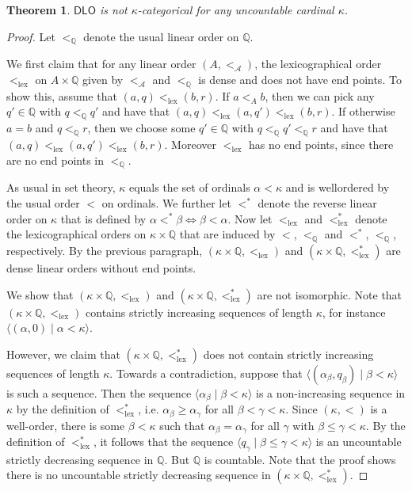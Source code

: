 \documentclass[a4paper, 11pt]{amsart}
\newtheorem{theorem}{Theorem}[subsection]
\theoremstyle{remark}
\newcommand{\QQ}{\mathbb{Q}}
\newcommand{\cA}{\mathcal A}
\newcommand{\DLO}{\mathsf{DLO}}
\newcommand{\lex}{\mathrm{lex}}
\begin{document}
\begin{theorem} 
$\DLO$ is not $\kappa$-categorical for any uncountable cardinal $\kappa$. 
\end{theorem} 
\begin{proof} 
Let $<_\QQ$ denote the usual linear order on $\QQ$. 

We first claim that for any linear order $(A,<_\cA)$, the lexicographical order $<_\lex$ on $A\times \QQ$ given by $<_\cA$ and $<_\QQ$ is dense and does not have end points. To show this, assume that $(a,q)<_\lex (b,r)$. If $a<_A b$, then we can pick any $q'\in \QQ$ with $q<_\QQ q'$ and have that $(a,q)<_\lex(a,q')<_\lex(b,r)$. If otherwise $a= b$ and $q<_\QQ r$, then we choose some $q'\in\QQ$ with $q<_\QQ q'<_\QQ r$ and have that $(a,q)<_\lex(a,q')<_\lex(b,r)$. Moreover $<_\lex$ has no end points, since there are no end points in $<_\QQ$. 

As usual in set theory, $\kappa$ equals the set of ordinals $\alpha<\kappa$ and is wellordered by the usual order $<$ on ordinals. 
We further let $<^*$ denote the reverse linear order on $\kappa$ that is defined by $\alpha<^*\beta\Longleftrightarrow \beta<\alpha$. 
Now let $<_\lex$ and $<^*_\lex$ denote the lexicographical orders on $\kappa\times \QQ$ that are induced by $<$, $<_\QQ$ and  $<^*$, $<_\QQ$, respectively.  
By the previous paragraph,  $(\kappa\times \QQ, <_\lex)$ and $(\kappa\times \QQ, <_\lex^*)$ are dense linear orders without end points. 

We show that $(\kappa\times \QQ, <_\lex)$ and $(\kappa\times \QQ, <_\lex^*)$ are not isomorphic. 
Note that $(\kappa\times \QQ, <_\lex)$ contains strictly increasing sequences of length $\kappa$, for instance $\langle(\alpha,0)\mid \alpha<\kappa\rangle$. 

However, we claim that $(\kappa\times \QQ, <_\lex^*)$ does not contain strictly increasing sequences of length $\kappa$. 
Towards a contradiction, suppose that $\langle (\alpha_\beta,q_\beta)\mid \beta<\kappa\rangle$ is such a sequence. 
Then the sequence $\langle \alpha_\beta\mid \beta<\kappa\rangle$ is a non-increasing sequence in $\kappa$ by the definition of $<_\lex^*$, i.e. $\alpha_\beta\geq \alpha_\gamma$ for all $\beta<\gamma<\kappa$. 
Since $(\kappa,<)$ is a well-order, there is some $\beta<\kappa$ such that $\alpha_\beta=\alpha_\gamma$ for all $\gamma$ with $\beta\leq \gamma<\kappa$. By the definition of $<_\lex^*$, it follows that the sequence $\langle q_\gamma\mid \beta\leq \gamma<\kappa\rangle$ is an uncountable strictly decreasing sequence in $\QQ$. 
But $\QQ$ is countable. 
Note that the proof shows there is no uncountable strictly decreasing sequence in $(\kappa\times \QQ, <_\lex^*)$. 
\end{proof} 
\end{document}
